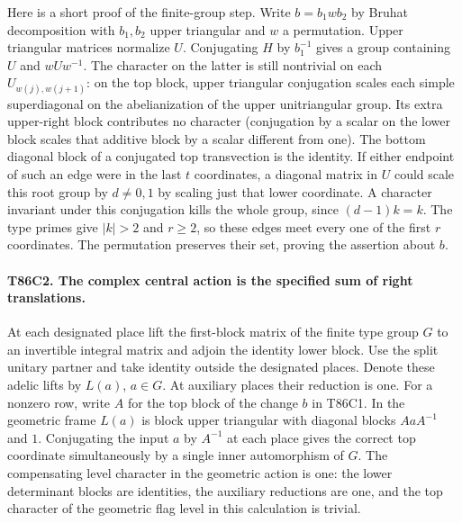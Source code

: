 Here is a short proof of the finite-group step. Write $b=b_1wb_2$
by Bruhat decomposition with $b_1,b_2$ upper triangular and $w$
a permutation. Upper triangular matrices normalize $U$. Conjugating
$H$ by $b_1^{-1}$ gives a group containing $U$ and $wUw^{-1}$.
The character on the latter is still nontrivial on each
$U_{w(j),w(j+1)}$: on the top block, upper triangular conjugation
scales each simple superdiagonal on the abelianization of the
upper unitriangular group. Its extra upper-right block contributes
no character (conjugation by a scalar on the lower block scales
that additive block by a scalar different from one). The bottom
diagonal block of a conjugated top transvection is the identity.
If either endpoint of such an edge were in the last $t$ coordinates,
a diagonal matrix in $U$ could scale this root group by $d\ne0,1$
by scaling just that lower coordinate. A character invariant under
this conjugation kills the whole group, since $(d-1)k=k$.
The type primes give $|k|>2$ and $r\ge2$, so these edges meet
every one of the first $r$ coordinates. The permutation preserves
their set, proving the assertion about $b$.

\paragraph{T86C2. The complex central action is the specified sum of right translations.}
At each designated place lift the first-block matrix of the finite
type group $G$ to an invertible integral matrix and adjoin the identity
lower block. Use the split unitary partner and take identity outside
the designated places. Denote these adelic lifts by $L(a)$, $a\in G$.
At auxiliary places their reduction is one. For a nonzero row, write
$A$ for the top block of the change $b$ in T86C1. In the geometric
frame $L(a)$ is block upper triangular with diagonal blocks
$AaA^{-1}$ and $1$. Conjugating the input $a$ by $A^{-1}$ at
each place gives the correct top coordinate simultaneously by a single
inner automorphism of $G$. The compensating level character in the
geometric action is one: the lower determinant blocks are identities,
the auxiliary reductions are one, and the top character of the
geometric flag level in this calculation is trivial.

